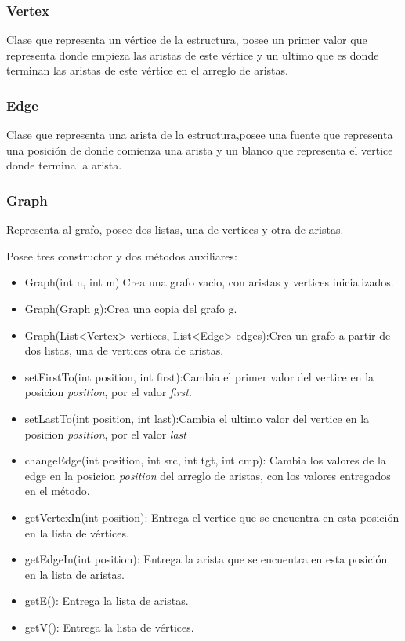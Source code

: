 \documentclass[letterpaper,10pt]{article}
\begin{document}
	\subsubsection{Vertex}

	Clase que representa un vértice de la estructura, posee un primer valor que representa donde empieza las aristas de este vértice y un ultimo que es donde terminan las aristas de este vértice en el arreglo de aristas.

	\subsubsection{Edge}
	Clase que representa una arista de la estructura,posee una fuente que representa una posición de donde comienza una arista y un blanco que representa el vertice donde termina la arista. 
	

	\subsubsection{Graph}

	Representa al grafo, posee dos listas, una de vertices y otra de aristas.

	Posee tres constructor y dos métodos auxiliares:
	\begin{itemize}
		\item Graph(int n, int m):Crea una grafo vacio, con aristas  y vertices inicializados.
		\item Graph(Graph g):Crea una copia del grafo g.
		\item Graph(List<Vertex> vertices, List<Edge> edges):Crea un grafo a partir de dos listas, una de vertices  otra de aristas.
		\item setFirstTo(int position, int first):Cambia el primer valor del vertice en la posicion \textit{position}, por el valor \textit{first}.
		\item setLastTo(int position, int last):Cambia el ultimo valor del vertice en la posicion \textit{position}, por el valor \textit{last}
		\item changeEdge(int position, int src, int tgt, int cmp): Cambia los valores de la edge en la posicion \textit{position} del arreglo de aristas, con los valores entregados en el método.
		\item getVertexIn(int position): Entrega el vertice que se encuentra en esta posición en la lista de vértices.
		\item getEdgeIn(int position): Entrega la arista que se encuentra en esta posición en la lista de aristas.
		\item getE(): Entrega la lista de aristas.
		\item getV(): Entrega la lista de vértices.
	\end{itemize}
    
\end{document}
